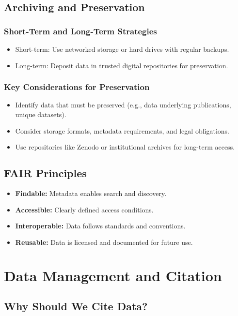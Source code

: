 \subsection{Archiving and Preservation}
\subsubsection{Short-Term and Long-Term Strategies}
\begin{itemize}
    \item Short-term: Use networked storage or hard drives with regular backups.
    \item Long-term: Deposit data in trusted digital repositories for preservation.
\end{itemize}

\subsubsection{Key Considerations for Preservation}
\begin{itemize}
    \item Identify data that must be preserved (e.g., data underlying publications, unique datasets).
    \item Consider storage formats, metadata requirements, and legal obligations.
    \item Use repositories like Zenodo or institutional archives for long-term access.
\end{itemize}

\subsection{FAIR Principles}
\begin{itemize}
    \item \textbf{Findable:} Metadata enables search and discovery.
    \item \textbf{Accessible:} Clearly defined access conditions.
    \item \textbf{Interoperable:} Data follows standards and conventions.
    \item \textbf{Reusable:} Data is licensed and documented for future use.
\end{itemize}
\section{Data Management and Citation}

\subsection{Why Should We Cite Data?}
